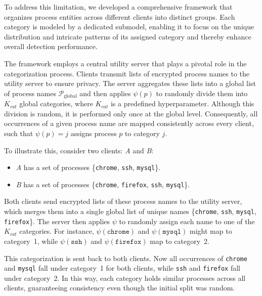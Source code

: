 To address this limitation, we developed a comprehensive framework that organizes process entities across different clients into distinct groups. Each category is modeled by a dedicated submodel, enabling it to focus on the unique distribution and intricate patterns of its assigned category and thereby enhance overall detection performance.

The framework employs a central utility server that plays a pivotal role in the categorization process. Clients transmit lists of encrypted process names to the utility server to ensure privacy. The server aggregates these lists into a global list of process names \( \mathcal{P}_{\text{global}} \) and then applies \( \psi(p) \) to randomly divide them into \( K_{cat} \) global categories, where \( K_{cat} \) is a predefined hyperparameter. Although this division is random, it is performed only once at the global level. Consequently, all occurrences of a given process name are mapped consistently across every client, such that \( \psi(p) = j \) assigns process \( p \) to category \( j \).





To illustrate this, consider two clients: \emph{A} and \emph{B}:
\begin{itemize}[itemsep=0.1em, parsep=0em, topsep=0em, leftmargin=*]
    \item \emph{A} has a set of processes \{\texttt{chrome}, \texttt{ssh}, \texttt{mysql}\}.
    \item \emph{B} has a set of processes \{\texttt{chrome}, \texttt{firefox}, \texttt{ssh}, \texttt{mysql}\}.
\end{itemize}

Both clients send encrypted lists of these process names to the utility server, which merges them into a single global list of unique names \{\texttt{chrome}, \texttt{ssh}, \texttt{mysql}, \texttt{firefox}\}. The server then applies \( \psi \) to randomly assign each name to one of the \( K_{cat} \) categories. For instance, \( \psi(\texttt{chrome}) \) and \( \psi(\texttt{mysql}) \) might map to category~1, while \( \psi(\texttt{ssh}) \) and \( \psi(\texttt{firefox}) \) map to category~2.

This categorization is sent back to both clients. Now all occurrences of \texttt{chrome} and \texttt{mysql} fall under category~1 for both clients, while \texttt{ssh} and \texttt{firefox} fall under category~2. In this way, each category holds similar processes across all clients, guaranteeing consistency even though the initial split was random.

